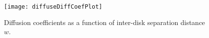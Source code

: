 \documentclass[aps,pre,showpacs,preprint,groupedaddress,floatfix]{revtex4-1}
\begin{document}
\begin{figure}
  \texttt{[image: diffuseDiffCoefPlot]}
  \caption[]{\label{fig-results} Diffusion coefficients as a function
    of inter-disk separation distance $w$.}
\end{figure}


%


\end{document}
